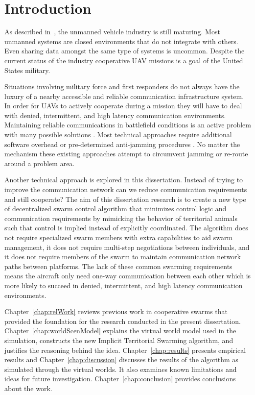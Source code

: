 \chapter{Introduction}
As described in~\textcite{dod_uas_roadmap}, the unmanned vehicle industry is still maturing.  Most unmanned systems are closed environments that do not integrate with others.  Even sharing data amongst the same type of systems is uncommon.  Despite the current status of the industry cooperative UAV missions is a goal of the United States military.

Situations involving military force and first responders do not always have the luxury of a nearby accessible and reliable communication infrastructure system.  In order for UAVs to actively cooperate during a mission they will have to deal with denied, intermittent, and high latency communication environments.  Maintaining reliable communications in battlefield conditions is an active problem with many possible solutions \parencites{tacom_modeling, gapr2_dtn_routing, unmet_wireless_challenges}. Most technical approaches require additional software overhead \parencite{p2p_tac_edge, reliable_tac_com} or pre-determined anti-jamming procedures \parencite{anti_jam_technique}.  No matter the mechanism these existing approaches attempt to circumvent jamming or re-route around a problem area.

Another technical approach is explored in this dissertation.  Instead of trying to improve the communication network can we reduce communication requirements and still cooperate? The aim of this dissertation research is to create a new type of decentralized swarm control algorithm that minimizes control logic and communication requirements by mimicking the behavior of territorial animals such that control is implied instead of explicitly coordinated.  The algorithm does not require specialized swarm members with extra capabilities to aid swarm management, it does not require multi-step negotiations between individuals, and it does not require members of the swarm to maintain communication network paths between platforms.  The lack of these common swarming requirements means the aircraft only need one-way communication between each other which is more likely to succeed in denied, intermittent, and high latency communication environments.

Chapter~\ref{chap:relWork} reviews previous work in cooperative swarms that provided the foundation for the research conducted in the present dissertation.  Chapter~\ref{chap:worldScenModel} explains the virtual world model used in the simulation, constructs the new Implicit Territorial Swarming algorithm, and justifies the reasoning behind the idea.  Chapter~\ref{chap:results} presents empirical results and Chapter~\ref{chap:discussion} discusses the results of the algorithm as simulated through the virtual worlds. It also examines known limitations and ideas for future investigation.  Chapter~\ref{chap:conclusion} provides conclusions about the work.

